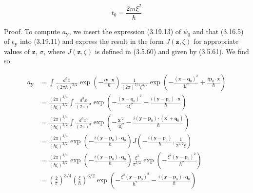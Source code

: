 \documentclass{article}
\begin{document}
\begin{equation*}
t_{0}=\frac{2 m \xi^{2}}{\hbar} \tag{3.19.17}
\end{equation*}
 

Proof. To compute $a_{\boldsymbol{y}}$, we insert the expression (3.19.13) of $\psi_{0}$ and that (3.16.5) of $\epsilon_{\boldsymbol{y}}$ into (3.19.11) and express the result in the form $J(\boldsymbol{z}, \zeta)$ for appropriate values of $\boldsymbol{z}$, $\sigma$, where $J(\boldsymbol{z}, \zeta)$ is defined in (3.5.60) and given by (3.5.61). We find so
 
\begin{align*}
a_{\boldsymbol{y}} & =\int \frac{d^{3} x}{(2 \pi \hbar)^{3 / 2}} \exp \left(-\frac{i \boldsymbol{y} \cdot \boldsymbol{x}}{\hbar}\right) \frac{1}{(2 \pi)^{3 / 4} \xi^{3 / 2}} \exp \left(-\frac{\left(\boldsymbol{x}-\boldsymbol{q}_{0}\right)^{2}}{4 \xi^{2}}+\frac{i \boldsymbol{p}_{0} \cdot \boldsymbol{x}}{\hbar}\right)  \tag{3.19.18}\\
& =\frac{(2 \pi)^{3 / 4}}{(\hbar \xi)^{3 / 2}} \int \frac{d^{3} x}{(2 \pi)^{3}} \exp \left(-\frac{\left(\boldsymbol{x}-\boldsymbol{q}_{0}\right)^{2}}{4 \xi^{2}}-\frac{i\left(\boldsymbol{y}-\boldsymbol{p}_{0}\right) \cdot \boldsymbol{x}}{\hbar}\right) \\
& =\frac{(2 \pi)^{3 / 4}}{(\hbar \xi)^{3 / 2}} \int \frac{d^{3} x^{\prime}}{(2 \pi)^{3}} \exp \left(-\frac{\boldsymbol{x}^{\prime 2}}{4 \xi^{2}}-\frac{i\left(\boldsymbol{y}-\boldsymbol{p}_{0}\right) \cdot\left(\boldsymbol{x}^{\prime}+\boldsymbol{q}_{0}\right)}{\hbar}\right) \\
& =\frac{(2 \pi)^{3 / 4}}{(\hbar \xi)^{3 / 2}} \exp \left(-\frac{i\left(\boldsymbol{y}-\boldsymbol{p}_{0}\right) \cdot \boldsymbol{q}_{0}}{\hbar}\right) J\left(-\frac{i\left(\boldsymbol{y}-\boldsymbol{p}_{0}\right)}{\hbar}, \frac{1}{2^{1 / 2} \xi}\right) \\
& =\frac{(2 \pi)^{3 / 4}}{(\hbar \xi)^{3 / 2}} \exp \left(-\frac{i\left(\boldsymbol{y}-\boldsymbol{p}_{0}\right) \cdot \boldsymbol{q}_{0}}{\hbar}\right) \frac{\xi^{3}}{\pi^{3 / 2}} \exp \left(-\frac{\xi^{2}\left(\boldsymbol{y}-\boldsymbol{p}_{0}\right)^{2}}{\hbar^{2}}\right) \\
& =\left(\frac{2}{\pi}\right)^{3 / 4}\left(\frac{\xi}{\hbar}\right)^{3 / 2} \exp \left(-\frac{\xi^{2}\left(\boldsymbol{y}-\boldsymbol{p}_{0}\right)^{2}}{\hbar^{2}}-\frac{i\left(\boldsymbol{y}-\boldsymbol{p}_{0}\right) \cdot \boldsymbol{q}_{0}}{\hbar}\right)
\end{align*}
 
\end{document}

